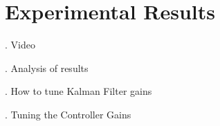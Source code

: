 \section{Experimental Results}

\begin{frame}{\thesection. \insertsection}
	Video
\end{frame}


\begin{frame}{\thesection. \insertsection}
	Analysis of results
\end{frame}


\begin{frame}{\thesection. \insertsection}
	How to tune Kalman Filter gains
\end{frame}


\begin{frame}{\thesection. \insertsection}
	Tuning the Controller Gains
\end{frame}